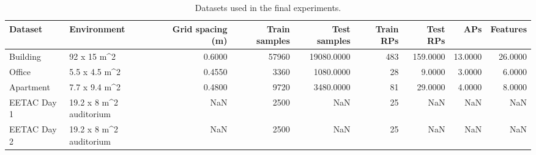 \begin{table}
\caption{Datasets used in the final experiments.}
\label{tab:final_dataset_summary}
\begin{tabular}{llrrrrrrr}
\toprule
Dataset & Environment & Grid spacing (m) & Train samples & Test samples & Train RPs & Test RPs & APs & Features \\
\midrule
Building & 92 x 15 m\textasciicircum 2 & 0.6000 & 57960 & 19080.0000 & 483 & 159.0000 & 13.0000 & 26.0000 \\
Office & 5.5 x 4.5 m\textasciicircum 2 & 0.4550 & 3360 & 1080.0000 & 28 & 9.0000 & 3.0000 & 6.0000 \\
Apartment & 7.7 x 9.4 m\textasciicircum 2 & 0.4800 & 9720 & 3480.0000 & 81 & 29.0000 & 4.0000 & 8.0000 \\
EETAC Day 1 & 19.2 x 8 m\textasciicircum 2 auditorium & NaN & 2500 & NaN & 25 & NaN & NaN & NaN \\
EETAC Day 2 & 19.2 x 8 m\textasciicircum 2 auditorium & NaN & 2500 & NaN & 25 & NaN & NaN & NaN \\
\bottomrule
\end{tabular}
\end{table}
